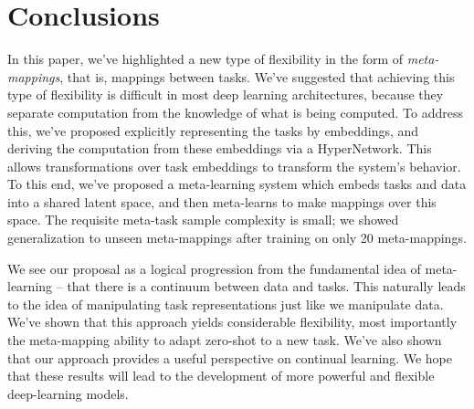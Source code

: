\documentclass{article}
\begin{document}
\section{Conclusions}
In this paper, we've highlighted a new type of flexibility in the form of \emph{meta-mappings}, that is, mappings between tasks. We've suggested that achieving this type of flexibility is difficult in most deep learning architectures, because they separate computation from the knowledge of what is being computed. To address this, we've proposed explicitly representing the tasks by embeddings, and deriving the computation from these embeddings via a HyperNetwork. This allows transformations over task embeddings to transform the system's behavior. To this end, we've proposed a meta-learning system which embeds tasks and data into a shared latent space, and then meta-learns to make mappings over this space. The requisite meta-task sample complexity is small; we showed generalization to unseen meta-mappings after training on only 20 meta-mappings.\par
We see our proposal as a logical progression from the fundamental idea of meta-learning -- that there is a continuum between data and tasks. This naturally leads to the idea of manipulating task representations just like we manipulate data. We've shown that this approach yields considerable flexibility, most importantly the meta-mapping ability to adapt zero-shot to a new task. We've also shown that our approach provides a useful perspective on continual learning. We hope that these results will lead to the development of more powerful and flexible deep-learning models. \par




\newpage

\end{document}
